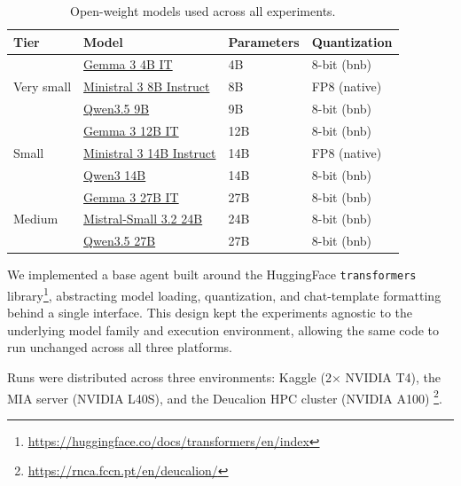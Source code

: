 \begin{table}
\centering
\small
\caption{Open-weight models used across all experiments.}
\label{tab:experiment-models}
\begin{tabular}{llll}
\toprule
\textbf{Tier} & \textbf{Model} & \textbf{Parameters} & \textbf{Quantization} \\
\midrule
\multirow{3}{*}{Very small}
& \href{https://huggingface.co/google/gemma-3-4b-it}{Gemma 3 4B IT}                         & 4B  & 8-bit (bnb)  \\
& \href{https://huggingface.co/mistralai/Ministral-3-8B-Instruct-2512}{Ministral 3 8B Instruct} & 8B  & FP8 (native) \\
& \href{https://huggingface.co/Qwen/Qwen3.5-9B}{Qwen3.5 9B}                                  & 9B  & 8-bit (bnb)  \\
\midrule
\multirow{3}{*}{Small}
& \href{https://huggingface.co/google/gemma-3-12b-it}{Gemma 3 12B IT}                        & 12B & 8-bit (bnb)  \\
& \href{https://huggingface.co/mistralai/Ministral-3-14B-Instruct-2512}{Ministral 3 14B Instruct} & 14B & FP8 (native) \\
& \href{https://huggingface.co/Qwen/Qwen3-14B}{Qwen3 14B}                                    & 14B & 8-bit (bnb)  \\
\midrule
\multirow{3}{*}{Medium}
& \href{https://huggingface.co/google/gemma-3-27b-it}{Gemma 3 27B IT}                        & 27B & 8-bit (bnb)  \\
& \href{https://huggingface.co/mistralai/Mistral-Small-3.2-24B-Instruct-2506}{Mistral-Small 3.2 24B} & 24B & 8-bit (bnb)  \\
& \href{https://huggingface.co/Qwen/Qwen3.5-27B}{Qwen3.5 27B}                                & 27B & 8-bit (bnb)  \\
\bottomrule
\end{tabular}
\end{table}


We implemented a base agent built around the HuggingFace \texttt{transformers} library\footnote{\url{https://huggingface.co/docs/transformers/en/index}}, abstracting model loading, quantization, and chat-template formatting behind a single interface. This design kept the experiments agnostic to the underlying model family and execution environment, allowing the same code to run unchanged across all three platforms.

Runs were distributed across three environments: Kaggle (2$\times$ NVIDIA T4), the MIA server (NVIDIA L40S), and the Deucalion HPC cluster (NVIDIA A100) \footnote{\url{https://rnca.fccn.pt/en/deucalion/}}.

